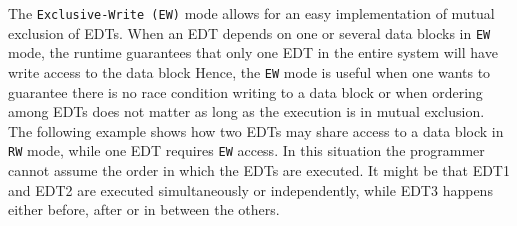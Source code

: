 The {\tt Exclusive-Write (EW)} mode allows for an easy implementation
of mutual exclusion of EDTs. When an EDT depends on one or several
data blocks in {\tt EW} mode, the runtime guarantees that only one EDT
in the entire system will have write access to the data block Hence,
the {\tt EW} mode is useful when one wants to guarantee there is no
race condition writing to a data block or when ordering among EDTs
does not matter as long as the execution is in mutual exclusion. The
following example shows how two EDTs may share access to a data block
in {\tt RW} mode, while one EDT requires {\tt EW} access. In this
situation the programmer cannot assume the order in which the EDTs are
executed. It might be that EDT1 and EDT2 are executed simultaneously
or independently, while EDT3 happens either before, after or in
between the others.


